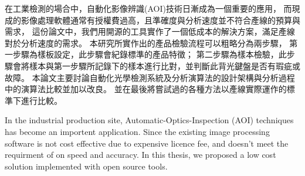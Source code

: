 \begin{abstractzh}
在工業檢測的場合中，自動化影像辨識(AOI)技術日漸成為一個重要的應用，
而現成的影像處理軟體通常有授權費過高，且準確度與分析速度並不符合產線的預算與需求，
這份論文中，我們用開源的工具實作了一個低成本的解決方案，滿足產線對於分析速度的需求。
本研究所實作出的產品檢驗流程可以粗略分為兩步驟，
第一步驟為樣板設定，此步驟會紀錄標準的產品特徵；
第二步驟為樣本檢驗，此步驟會將樣本與第一步驟所記錄下的樣本進行比對，並判斷此背光鍵盤是否有瑕疵或故障。
本論文主要討論自動化光學檢測系統及分析演算法的設計架構與分析過程中的演算法比較並加以改良。
並在最後將嘗試過的各種方法以產線實際運作的標準下進行比較。

\end{abstractzh}

\begin{abstracten}
In the industrial production site, Automatic-Optics-Inspection (AOI) techniques has become an importent application.
Since the existing image processing software is not cost effective due to expensive licence fee, 
and doesn't meet the requirment of on speed and accuracy. 
In this thesis, we proposed a low cost solution implemented with open source tools.


\end{abstracten}